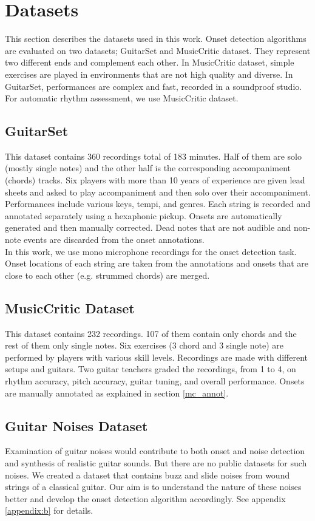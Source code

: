 \chapter{Datasets}

This section describes the datasets used in this work. Onset detection algorithms are evaluated on two datasets; GuitarSet and MusicCritic dataset. They represent two different ends and complement each other. In MusicCritic dataset, simple exercises are played in environments that are not high quality and diverse. In GuitarSet, performances are complex and fast, recorded in a soundproof studio. For automatic rhythm assessment, we use MusicCritic dataset.

\section{GuitarSet}

This dataset \cite{xi2018guitarset} contains 360 recordings total of 183 minutes. Half of them are solo (mostly single notes) and the other half is the corresponding accompaniment (chords) tracks. Six players with more than 10 years of experience are given lead sheets and asked to play accompaniment and then solo over their accompaniment. Performances include various keys, tempi, and genres. Each string is recorded and annotated separately using a hexaphonic pickup. Onsets are automatically generated and then manually corrected. Dead notes that are not audible and non-note events are discarded from the onset annotations.\\ 
In this work, we use mono microphone recordings for the onset detection task. Onset locations of each string are taken from the annotations and onsets that are close to each other (e.g. strummed chords) are merged.


\section{MusicCritic Dataset}

This dataset \cite{eremenko2020performance} contains 232 recordings. 107 of them contain only chords and the rest of them only single notes. Six exercises (3 chord and 3 single note) are performed by players with various skill levels. Recordings are made with different setups and guitars. Two guitar teachers graded the recordings, from 1 to 4, on rhythm accuracy, pitch accuracy, guitar tuning, and overall performance. Onsets are manually annotated as explained in section \ref{mc_annot}.

\section{Guitar Noises Dataset}

Examination of guitar noises would contribute to both onset and noise detection and synthesis of realistic guitar sounds. But there are no public datasets for such noises. We created a dataset that contains buzz and slide noises from wound strings of a classical guitar. Our aim is to understand the nature of these noises better and develop the onset detection algorithm accordingly. See appendix \ref{appendix:b} for details. \\

